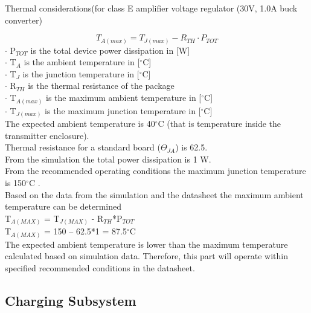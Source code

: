 \documentclass[12pt]{article}
\begin{document}
\pagebreak

\noindent
Thermal considerations(for class E amplifier voltage regulator (30V, 1.0A buck converter) 

\begin{equation}
T_{A(max)} = T_{J(max)} - R_{TH} \cdot P_{TOT}
\end{equation}
\noindent
$\cdot $ P$_{TOT}$ is the total device power dissipation in [W]
\\
\noindent
$\cdot $ T$_A$ is the ambient temperature in [$^\circ$C]
\\
\noindent
$\cdot $ T$_J$ is the junction temperature in [$^\circ$C]
\\
\noindent
$\cdot $ R$_{TH}$ is the thermal resistance of the package 
\\
\noindent
$\cdot $ T$_{A(max)}$ is the maximum ambient temperature in [$^\circ$C]
\\
\noindent
$\cdot $ T$_{J(max)}$ is the maximum junction temperature in [$^\circ$C]
\\

\noindent
The expected ambient temperature is 40$^\circ$C (that is temperature inside the transmitter enclosure).\\
Thermal resistance for a standard board ($\Theta_{JA}$) is 62.5 \cite{TPS54160}.\\
From the simulation the total power dissipation is 1 W.\\
From the recommended operating conditions the maximum junction temperature is 150$^\circ$C \cite{TPS54160}.\\
Based on the data from the simulation and the datasheet the maximum ambient temperature can be determined\\
T$_{A(MAX)}$ = T$_{J(MAX)}$ - R$_{TH}$*P$_{TOT}$ \\
T$_{A(MAX)}$ = 150 – 62.5*1 = 87.5$^\circ$C\\
The expected ambient temperature is lower than the maximum temperature calculated based on simulation data. Therefore, this part will operate within specified recommended conditions in the datasheet.

\subsection{Charging Subsystem}
\end{document}
